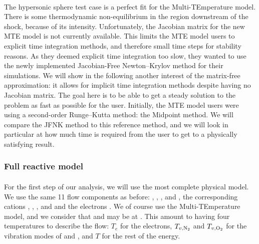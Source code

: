       \paragraph{}
      The hypersonic sphere test case is a perfect fit for the Multi-TEmperature model.
      There is some thermodynamic non-equilibrium in the region downstream of the shock, because of its intensity.
      Unfortunately, the Jacobian matrix for the new MTE model is not currently available.
      This limits the MTE model users to explicit time integration methods, and therefore small time steps for stability reasons.
      As they deemed explicit time integration too slow, they wanted to use the newly implemented Jacobian-Free Newton--Krylov method for their simulations.
      We will show in the following another interest of the matrix-free approximation: it allows for implicit time integration methods despite having no Jacobian matrix.
      The goal here is to be able to get a steady solution to the problem as fast as possible for the user.
      Initially, the MTE model users were using a second-order Runge--Kutta method: the Midpoint method.
      We will compare the JFNK method to this reference method, and we will look in particular at how much time is required from the user to get to a physically satisfying result.


      \subsubsection{Full reactive model}

        \paragraph{}
        For the first step of our analysis, we will use the most complete physical model.
        We use the same 11 flow components as before: , , ,  and , the corresponding cations , , ,  and  and the electrons .
        We of course use the Multi-TEmperature model, and we consider that  and  may be at .
        This amount to having four temperatures to describe the flow: $T_e$ for the electrons, $T_{v, \ce{N_2}}$ and $T_{v, \ce{O_2}}$ for the vibration modes of  and , and $T$ for the rest of the energy.

